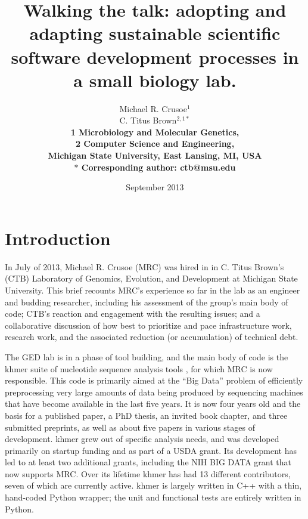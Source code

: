 \documentclass[11pt]{article}
\date{September 2013}
\title{Walking the talk: adopting and adapting sustainable scientific software
  development processes in a small biology lab.}
\author{Michael R. Crusoe$^{1}$\\
C. Titus Brown$^{2,1\ast}$\\
\small \bf{1} Microbiology and Molecular Genetics,\\
\small \bf{2} Computer Science and Engineering,\\
\small Michigan State University, East Lansing, MI, USA\\
\small $\ast$ Corresponding author: ctb@msu.edu}
\begin{document}
\maketitle


\setlength{\parindent}{0pt}
\setlength{\parindent}{0pt}
\setlength{\parskip}{0.70ex}

\section{Introduction}

In July of 2013, Michael R. Crusoe (MRC) was hired in in C. Titus
Brown's (CTB) Laboratory of Genomics, Evolution, and Development at
Michigan State University.  This brief recounts MRC's experience so
far in the lab as an engineer and budding researcher, including his
assessment of the group's main body of code; CTB's reaction and
engagement with the resulting issues; and a collaborative discussion
of how best to prioritize and pace infrastructure work, research work,
and the associated reduction (or accumulation) of technical debt.

The GED lab is in a phase of tool building, and the main body of code
is the khmer suite of nucleotide sequence analysis tools \cite{khmer}, for
which MRC is now responsible.  This code is primarily aimed at the
``Big Data'' problem of efficiently preprocessing very large amounts
of data being produced by sequencing machines that have become
available in the last five years.  It is now four years old and the
basis for a published paper, a PhD thesis, an invited book chapter,
and three submitted preprints, as well as about five papers in various
stages of development.  khmer grew out of specific analysis needs, and
was developed primarily on startup funding and as part of a USDA
grant.  Its development has led to at least two additional grants,
including the NIH BIG DATA grant that now supports MRC.  Over its
lifetime khmer has had 13 different contributors, seven of which are
currently active.  khmer is largely written in C++ with a thin,
hand-coded Python wrapper; the unit and functional tests are entirely
written in Python.
\end{document}
